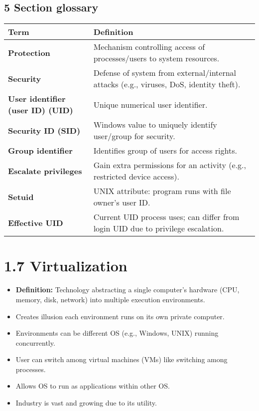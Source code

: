 \documentclass{article}
\begin{document}
\subsection*{5 Section glossary}
\centering
\begin{tabular}{>{\raggedright}p{} >{\raggedright\arraybackslash}p{}}
\toprule
\textbf{Term} & \textbf{Definition} \\
\midrule
\textbf{Protection} & Mechanism controlling access of processes/users to system resources. \\
\textbf{Security} & Defense of system from external/internal attacks (e.g., viruses, DoS, identity theft). \\
\textbf{User identifier (user ID) (UID)} & Unique numerical user identifier. \\
\textbf{Security ID (SID)} & Windows value to uniquely identify user/group for security. \\
\textbf{Group identifier} & Identifies group of users for access rights. \\
\textbf{Escalate privileges} & Gain extra permissions for an activity (e.g., restricted device access). \\
\textbf{Setuid} & UNIX attribute: program runs with file owner's user ID. \\
\textbf{Effective UID} & Current UID process uses; can differ from login UID due to privilege escalation. \\
\bottomrule
\end{tabular}
\vspace{\baselineskip}

\newpage
\section*{1.7 Virtualization}
\begin{itemize}
    \item \textbf{Definition:} Technology abstracting a single computer's hardware (CPU, memory, disk, network) into multiple execution environments.
    \item Creates illusion each environment runs on its own private computer.
    \item Environments can be different OS (e.g., Windows, UNIX) running concurrently.
    \item User can switch among virtual machines (VMs) like switching among processes.
    \item Allows OS to run as applications within other OS.
    \item Industry is vast and growing due to its utility.
\end{itemize}
\end{document}
